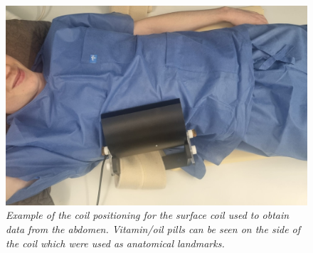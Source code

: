 \begin{figure}
    \centering
    \includegraphics[width=1\textwidth]{Figures/Lipid/Coil_Photo.jpeg}
    \caption{\textit{Example of the coil positioning for the surface coil used to obtain data from the abdomen. Vitamin/oil pills can be seen on the side of the coil which were used as anatomical landmarks.}}
    \label{fig:Lip:Coil_Photo}
\end{figure}

